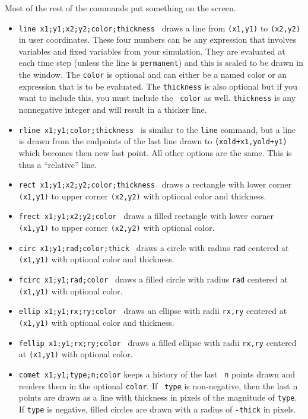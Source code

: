 \documentclass{article}
\begin{document}
Most of the rest of the  commands put something on the screen. 
\begin{itemize}

\item {\tt line x1;y1;x2;y2;color;thickness }  draws a line from {\tt (x1,y1)} 
to {\tt (x2,y2)} in user coordinates.  These four numbers can be any
expression that involves variables and fixed variables from your
simulation. They are evaluated at each time step (unless the line is
{\tt permanent}) and this is scaled to be drawn in the window.  The
{\tt color} is optional and can either be a named color or an
expression that is to be evaluated. The {\tt thickness} is also
optional but if you want to include this, you must include the {\tt
color} as well. {\tt thickness} is any nonnegative integer and will
result in a thicker line. 

\item {\tt rline x1;y1;color;thickness } is similar to the {\tt line}
command, but a line is drawn from the endpoints of the last line drawn
to {\tt (xold+x1,yold+y1)} which becomes then new last point. All other options
are the same. This is thus a ``relative'' line.

\item {\tt rect x1;y1;x2;y2;color;thickness } draws a rectangle with
lower corner {\tt (x1,y1)} to upper corner {\tt (x2,y2)} with optional
color and thickness. 

\item {\tt frect x1;y1;x2;y2;color } draws a filled rectangle with
lower corner {\tt (x1,y1)} to upper corner {\tt (x2,y2)} with optional
color. 

\item {\tt circ x1;y1;rad;color;thick } draws a circle with radius {\tt rad}
centered at {\tt (x1,y1)} with optional
color and thickness.

\item {\tt fcirc x1;y1;rad;color } draws a filled circle with radius {\tt rad}
centered at {\tt (x1,y1)} with optional color.

\item {\tt ellip x1;y1;rx;ry;color } draws an ellipse with radii {\tt rx,ry}
centered at {\tt (x1,y1)} with optional
color and thickness. 

\item {\tt fellip x1;y1;rx;ry;color } draws a filled ellipse with
radii {\tt rx,ry}  centered at {\tt (x1,y1)} with optional
color. 

\item {\tt comet x1;y1;type;n;color} keeps a history of the last {\tt
n} points drawn and renders them in the optional {\tt color}. If {\tt
type} is non-negative, then the last n points are drawn as a line with
thickness in pixels of the magnitude of {\tt type}.  If {\tt type} is
negative, filled circles are drawn with a radius of {\tt -thick} in
pixels.


\end{itemize}
\end{document}
